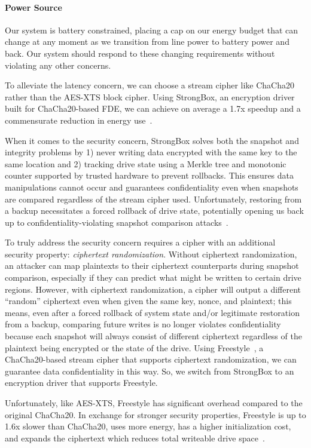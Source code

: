 \paragraph{Power Source} Our system is battery constrained, placing a
cap on our energy budget that can change at any moment as we
transition from line power to battery power and back. Our system
should respond to these changing requirements without violating any
other concerns.

To alleviate the latency concern, we can choose a stream cipher like
ChaCha20 rather than the AES-XTS block cipher. Using StrongBox, an
encryption driver built for ChaCha20-based FDE, we can achieve on
average a 1.7x speedup and a commensurate reduction in energy
use~\cite{StrongBox}.

When it comes to the security concern, StrongBox solves both the snapshot and
integrity problems by 1) never writing data encrypted with the same key to the
same location and 2) tracking drive state using a Merkle tree and monotonic
counter supported by trusted hardware to prevent rollbacks. This ensures data
manipulations cannot occur and guarantees confidentiality even when snapshots
are compared regardless of the stream cipher used. Unfortunately, restoring from
a backup necessitates a forced rollback of drive state, potentially opening us
back up to confidentiality-violating snapshot comparison
attacks~\cite{StrongBox}.

To truly address the security concern requires a cipher with an additional
security property: \emph{ciphertext randomization}. Without ciphertext
randomization, an attacker can map plaintexts to their ciphertext counterparts
during snapshot comparison, especially if they can predict what might be written
to certain drive regions. However, with ciphertext randomization, a cipher will
output a different ``random'' ciphertext even when given the same key, nonce,
and plaintext; this means, even after a forced rollback of system state and/or
legitimate restoration from a backup, comparing future writes is no longer
violates confidentiality because each snapshot will always consist of different
ciphertext regardless of the plaintext being encrypted or the state of the
drive. Using Freestyle~\cite{Freestyle}, a ChaCha20-based stream cipher that
supports ciphertext randomization, we can guarantee data confidentiality in this
way. So, we switch from StrongBox to an encryption driver that supports
Freestyle.

Unfortunately, like AES-XTS, Freestyle has significant overhead compared to the
original ChaCha20. In exchange for stronger security properties, Freestyle is up
to 1.6x slower than ChaCha20, uses more energy, has a higher initialization
cost, and expands the ciphertext which reduces total writeable drive
space~\cite{Freestyle}.

